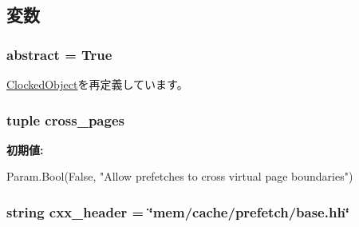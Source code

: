 \subsection{変数}
\hypertarget{classPrefetcher_1_1BasePrefetcher_a17fa61ac3806b481cafee5593b55e5d0}{
\subsubsection[{abstract}]{\setlength{\rightskip}{0pt plus 5cm}abstract = True}}
\label{classPrefetcher_1_1BasePrefetcher_a17fa61ac3806b481cafee5593b55e5d0}


\hyperlink{classClockedObject_1_1ClockedObject_a17fa61ac3806b481cafee5593b55e5d0}{ClockedObject}を再定義しています。\hypertarget{classPrefetcher_1_1BasePrefetcher_ad0785a32065cd1e34887ccc7ac8bb0a5}{
\subsubsection[{cross\_\-pages}]{\setlength{\rightskip}{0pt plus 5cm}tuple cross\_\-pages}}
\label{classPrefetcher_1_1BasePrefetcher_ad0785a32065cd1e34887ccc7ac8bb0a5}
{\bfseries 初期値:}
\begin{DoxyCode}
Param.Bool(False,
         "Allow prefetches to cross virtual page boundaries")
\end{DoxyCode}
\hypertarget{classPrefetcher_1_1BasePrefetcher_a17da7064bc5c518791f0c891eff05fda}{
\subsubsection[{cxx\_\-header}]{\setlength{\rightskip}{0pt plus 5cm}string cxx\_\-header = \char`\"{}mem/cache/prefetch/base.hh\char`\"{}}}
\label{classPrefetcher_1_1BasePrefetcher_a17da7064bc5c518791f0c891eff05fda}



